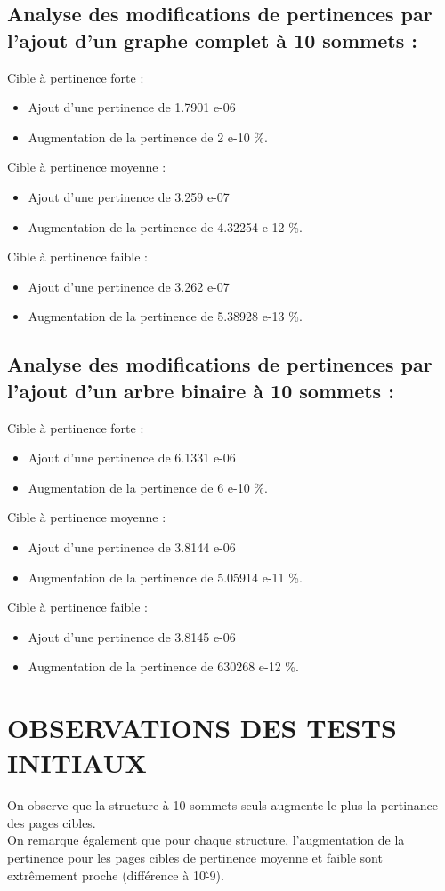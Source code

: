 \documentclass[a4paper,11pt]{article}
\begin{document}
	\subsection{Analyse des modifications de pertinences par l'ajout d'un graphe complet à 10 sommets :}
		Cible à pertinence forte :
		\begin{itemize} 	
			\item Ajout d'une pertinence de 1.7901 e-06
			\item Augmentation de la pertinence de 2 e-10 \%.
		\end{itemize}
		Cible à pertinence moyenne :
		\begin{itemize} 	
			\item Ajout d'une pertinence de 3.259 e-07
			\item Augmentation de la pertinence de 4.32254 e-12 \%.
		\end{itemize}
		Cible à pertinence faible :
		\begin{itemize} 	
			\item Ajout d'une pertinence de 3.262 e-07
			\item Augmentation de la pertinence de 5.38928 e-13 \%.
		\end{itemize}

		\subsection{Analyse des modifications de pertinences par l'ajout d'un arbre binaire à 10 sommets :}
		Cible à pertinence forte :
		\begin{itemize} 	
			\item Ajout d'une pertinence de 6.1331 e-06
			\item Augmentation de la pertinence de 6 e-10 \%.
		\end{itemize}
		Cible à pertinence moyenne :
		\begin{itemize} 	
			\item Ajout d'une pertinence de 3.8144 e-06
			\item Augmentation de la pertinence de 5.05914 e-11 \%.
		\end{itemize}
		Cible à pertinence faible :
		\begin{itemize} 	
			\item Ajout d'une pertinence de 3.8145 e-06
			\item Augmentation de la pertinence de 630268 e-12 \%.
		\end{itemize}

\section{OBSERVATIONS DES TESTS INITIAUX}
	On observe que la structure à 10 sommets seuls augmente le plus la pertinance des pages cibles.\\
	On remarque également que pour chaque structure, l'augmentation de la pertinence pour les pages cibles de pertinence moyenne et faible sont extrêmement proche (différence à 10\^-9).\\
\end{document}
